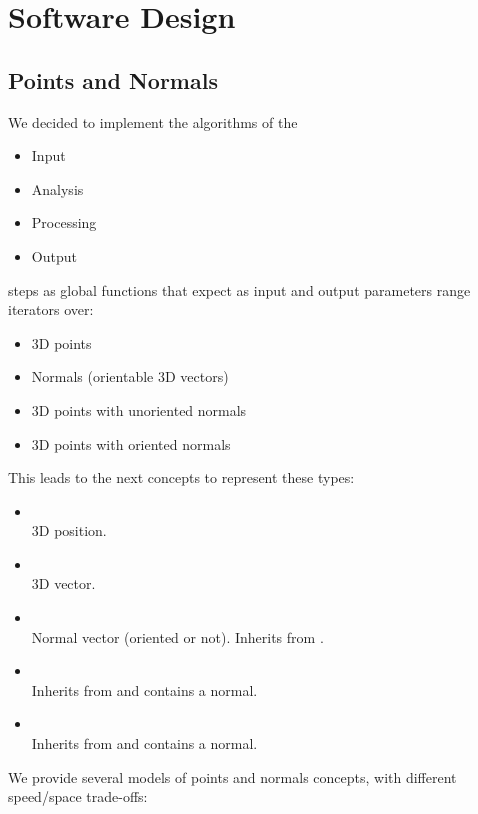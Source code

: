 \section{Software Design}

\subsection{Points and Normals}

We decided to implement the algorithms of the \\
\begin{itemize}
\item Input
\item Analysis
\item Processing
\item Output
\end{itemize}
steps as global functions that expect as input and output parameters range iterators over:

\begin{itemize}
\item 3D points
\item Normals (orientable 3D vectors)
\item 3D points with unoriented normals
\item 3D points with oriented normals
\end{itemize}

This leads to the next concepts to represent these types:

\begin{itemize}
\item {} \\
3D position.
\item {} \\
3D vector.
\item {} \\
Normal vector (oriented or not). Inherits from .
\item {} \\
Inherits from  and contains a  normal.
\item {} \\
Inherits from  and contains a  normal.
\end{itemize}

We provide several models of points and normals concepts, with different speed/space trade-offs:

